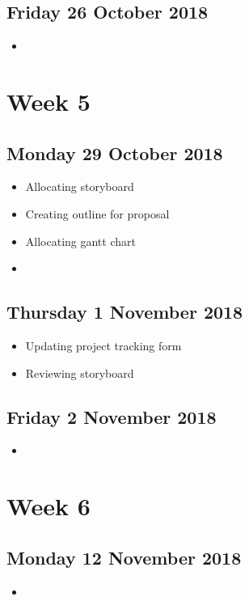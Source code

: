 \subsection*{Friday 26 October 2018}
\begin{itemize}
	\item
\end{itemize}

\section*{Week 5}
\subsection*{Monday 29 October 2018}
\begin{itemize}
	\item Allocating storyboard
	\item Creating outline for proposal
	\item Allocating gantt chart
	\item 
\end{itemize}

\subsection*{Thursday 1 November 2018}
\begin{itemize}
	\item Updating project tracking form
	\item Reviewing storyboard
\end{itemize}

\subsection*{Friday 2 November 2018}
\begin{itemize}
	\item
\end{itemize}

\section*{Week 6}
\subsection*{Monday 12 November 2018}
\begin{itemize}
	\item
\end{itemize}

